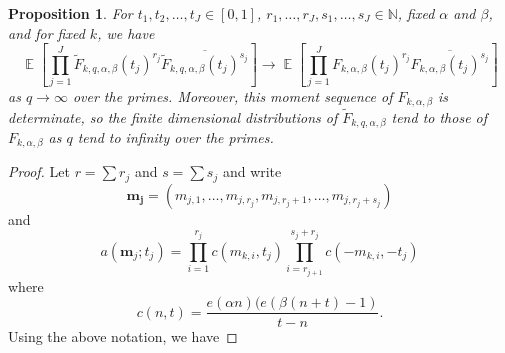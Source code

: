 \documentclass[12pt, a4paper]{amsart}
\newtheorem{proposition}{Proposition}
\theoremstyle{remark}
\newcommand{\N}{\mathbb{N}}
\newcommand{\bm}{\mathbf{m}}
\DeclareMathOperator{\E}{\mathbb{E}}
\begin{document}
\begin{proposition}\label{prop:chi-moments}
    For $t_1, t_2, \ldots, t_J \in [0,1]$, $r_1, \ldots, r_J, s_1, \ldots, s_J \in \N$,
    fixed $\alpha$ and $\beta$, and for fixed $k$, we have
\[
    \E \left[ \prod_{j=1}^J \tilde F_{k,q,\alpha,\beta}(t_j)^{r_j} \overline{\tilde F_{k,q,\alpha,\beta}(t_j)^{s_j}} \right]
    \longrightarrow
    \E \left[ \prod_{j=1}^J F_{k,\alpha,\beta}(t_j)^{r_j} \overline{F_{k,\alpha,\beta}(t_j)^{s_j}} \right]
\]
as $q \rightarrow \infty$ over the primes. Moreover, this moment sequence of
$F_{k,\alpha,\beta}$ is determinate, so the finite dimensional distributions of
$\tilde F_{k,q,\alpha,\beta}$ tend to those of $F_{k,\alpha,\beta}$ as $q$ tend to infinity
over the primes.
\end{proposition}
\begin{proof}
    Let $r = \sum r_j$ and $s = \sum s_j$ and write 
\[
    \mathbf{m_j}= (m_{j,1}, \dots, m_{j, r_j}, m_{j, r_j+1}, \dots, m_{j, r_j+s_j})
\]
and
\[
a(\bm_j; t_j)
=
    \prod_{i=1}^{r_j} c(m_{k,i}, t_j)
    \prod_{i=r_{j+1}}^{s_j + r_j} c(-m_{k,i}, -t_j)
\]
where
\[
    c(n,t) = \frac{e(\alpha n)(e(\beta(n + t) - 1)}{t-n}.
\]
Using the above notation, we have


\end{proof}
\end{document}
